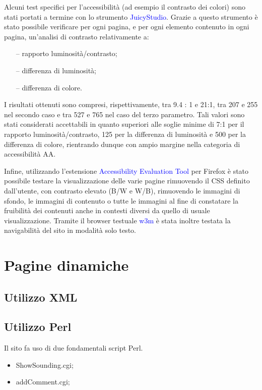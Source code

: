\documentclass[10pt,a4paper,onecolumn]{article}
\newcommand{\progname}[1]{\textcolor{blue}{\textsf{#1}}}
\begin{document}
Alcuni test specifici per l'accessibilità (ad esempio il contrasto dei colori) sono stati portati a termine con lo strumento \progname{JuicyStudio}. Grazie a questo strumento è stato possibile verificare per ogni pagina, e per ogni elemento contenuto in ogni pagina, un'analisi di contrasto relativamente a:
\begin{itemize}[noitemsep,nolistsep]
  \item[--] rapporto luminosità/contrasto;
  \item[--] differenza di luminosità;
  \item[--] differenza di colore.
\end{itemize}

I risultati ottenuti sono compresi, rispettivamente, tra 9.4 : 1 e 21:1, tra 207 e 255 nel secondo caso e tra 527 e 765 nel caso del terzo parametro. Tali valori sono stati considerati accettabili in quanto superiori alle soglie minime di 7:1 per il rapporto luminosità/contrasto, 125 per la differenza di luminosità e 500 per la differenza di colore, rientrando dunque con ampio margine nella categoria di accessibilità AA\@.

Infine, utilizzando l'estensione \progname{Accessibility Evaluation Tool} per Firefox è stato possibile testare la visualizzazione delle varie pagine rimuovendo il CSS definito dall'utente, con contrasto elevato (B/W e W/B), rimuovendo le immagini di sfondo, le immagini di contenuto o tutte le immagini al fine di constatare la fruibilità dei contenuti anche in contesti diversi da quello di usuale visualizzazione. Tramite il browser testuale \progname{w3m} è stata inoltre testata la navigabilità del sito in modalità solo testo. 

\section{Pagine dinamiche}

\subsection{Utilizzo XML}

\subsection{Utilizzo Perl}
Il sito fa uso di due fondamentali script Perl.
\begin{itemize}
  \item ShowSounding.cgi;
  \item addComment.cgi;
\end{itemize}
\end{document}
